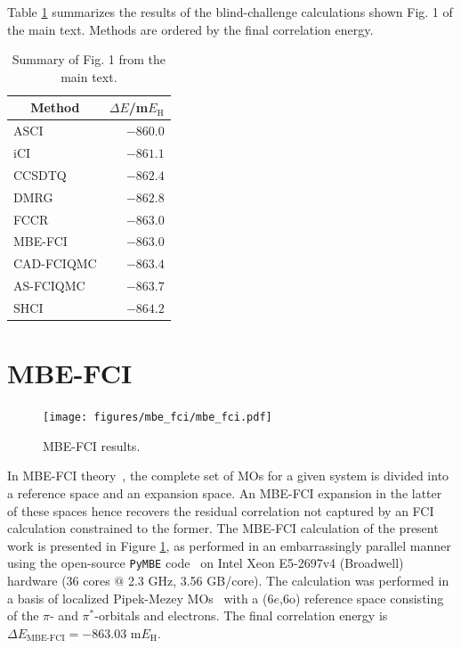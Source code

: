 \documentclass[journal=jcp,manuscript=suppinfo]{achemso}
\begin{document}
Table \ref{results_SI_table} summarizes the results of the blind-challenge calculations shown Fig. 1 of the main text. Methods are ordered by the final correlation energy.
%
\begin{table}[ht]
\begin{center}
\caption{Summary of Fig. 1 from the main text.}
\label{results_SI_table}
\begin{tabular}{l|r}
\toprule
\multicolumn{1}{c|}{Method} & \multicolumn{1}{c}{$\Delta E$/m$E_{\text{H}}$} \\
\midrule\midrule
ASCI & $-860.0$ \\
iCI & $-861.1$ \\
CCSDTQ & $-862.4$ \\
DMRG & $-862.8$ \\
FCCR & $-863.0$ \\
MBE-FCI & $-863.0$ \\
CAD-FCIQMC & $-863.4$ \\
AS-FCIQMC & $-863.7$ \\
SHCI & $-864.2$ \\
\midrule
\end{tabular}
\vspace{-1.4cm}
\end{center}
\end{table}
%

\section{MBE-FCI}

%
\begin{figure}[ht!]
\begin{center}
\texttt{[image: figures/mbe\_fci/mbe\_fci.pdf]}
\caption{MBE-FCI results.}
\label{mbe_fci_SI_fig}
\end{center}
\vspace{-0.6cm}
\end{figure}
%
In MBE-FCI theory~\cite{eriksen_mbe_fci_jpcl_2017,eriksen_mbe_fci_weak_corr_jctc_2018,eriksen_mbe_fci_strong_corr_jctc_2019,eriksen_mbe_fci_general_jpcl_2019}, the complete set of MOs for a given system is divided into a reference space and an expansion space. An MBE-FCI expansion in the latter of these spaces hence recovers the residual correlation not captured by an FCI calculation constrained to the former. The MBE-FCI calculation of the present work is presented in Figure \ref{mbe_fci_SI_fig}, as performed in an embarrassingly parallel manner using the open-source {\texttt{PyMBE}} code~\cite{pymbe} on Intel Xeon E5-2697v4 (Broadwell) hardware (36 cores $@$ 2.3 GHz, 3.56 GB/core). The calculation was performed in a basis of localized Pipek-Mezey MOs~\cite{pipek_mezey_jcp_1989} with a ($6e$,$6$o) reference space consisting of the $\pi$- and $\pi^{\ast}$-orbitals and electrons. The final correlation energy is $\Delta E_{\text{MBE-FCI}} = -863.03$ m$E_{\text{H}}$.\\
\end{document}
